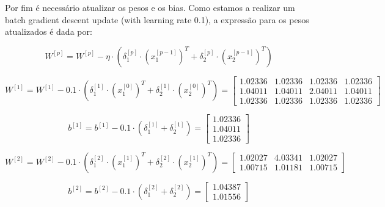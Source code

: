 \documentclass[a4paper,12pt]{article} %
\begin{document}
\begin{enumerate}
Por fim é necessário atualizar os pesos e os bias. Como estamos a realizar um batch gradient descent update (with learning rate 0.1), a expressão para os pesos atualizados é dada por:

\begin{equation*}
    W^{[p]} = W^{[p]} - \eta \cdot (\delta^{[p]}_1 \cdot (x^{[p-1]}_1)^T + \delta^{[p]}_2 \cdot (x^{[p-1]}_2)^T)
\end{equation*}

\begin{equation*}
    W^{[1]} = W^{[1]} - 0.1 \cdot (\delta^{[1]}_1 \cdot (x^{[0]}_1)^T + \delta^{[1]}_2 \cdot (x^{[0]}_2)^T) = \begin{bmatrix} 1.02336 & 1.02336 & 1.02336 & 1.02336 \\
                                                                                                                            1.04011 & 1.04011 & 2.04011 & 1.04011 \\
                                                                                                                            1.02336 & 1.02336 & 1.02336 & 1.02336 \end{bmatrix}
\end{equation*}

\begin{equation*}
    b^{[1]} = b^{[1]} - 0.1 \cdot (\delta^{[1]}_1 + \delta^{[1]}_2) = \begin{bmatrix} 1.02336 \\ 1.04011 \\ 1.02336 \end{bmatrix}
\end{equation*}

\begin{equation*}
    W^{[2]} = W^{[2]} - 0.1 \cdot (\delta^{[2]}_1 \cdot (x^{[1]}_1)^T + \delta^{[2]}_2 \cdot (x^{[1]}_2)^T) = \begin{bmatrix} 1.02027 & 4.03341 & 1.02027 \\
                                                                                                                            1.00715 & 1.01181 & 1.00715 \end{bmatrix}
\end{equation*}

\begin{equation*}
    b^{[2]} = b^{[2]} - 0.1 \cdot (\delta^{[2]}_1 + \delta^{[2]}_2) = \begin{bmatrix} 1.04387 \\ 1.01556 \end{bmatrix}
\end{equation*}


\end{enumerate}
\end{document}
